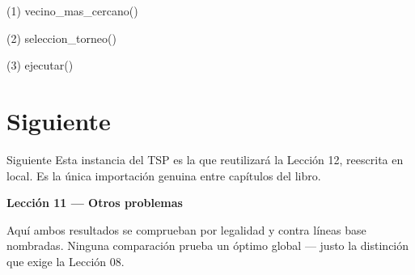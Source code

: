 \begin{frame}[fragile]{(1) vecino\_mas\_cercano()}

\end{frame}

\begin{frame}[fragile]{(2) seleccion\_torneo()}

\end{frame}

\begin{frame}[fragile]{(3) ejecutar()}

\end{frame}


\section{Siguiente}

\begin{frame}{Siguiente}
Esta instancia del TSP es la que reutilizará la Lección 12, reescrita en local. Es la única importación genuina entre capítulos del libro.

\vspace{0.8em}
\textbf{Lección 11 --- Otros problemas}

Aquí ambos resultados se comprueban por legalidad y contra líneas base nombradas. Ninguna comparación prueba un óptimo global --- justo la distinción que exige la Lección 08.
\end{frame}

